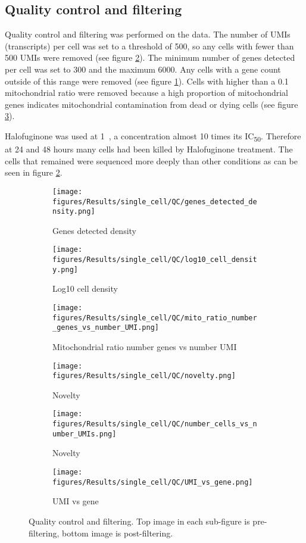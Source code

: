 \subsection{Quality control and filtering}
Quality control and filtering was performed on the data.
The number of UMIs (transcripts) per cell was set to a threshold of 500, so any cells with fewer than 500 UMIs were removed (see figure \ref{fig:QC_log10}).
The minimum number of genes detected per cell was set to 300 and the maximum 6000.
Any cells with a gene count outside of this range were removed (see figure \ref{fig:QC_genes_detected}).
Cells with higher than a 0.1 mitochondrial ratio were removed because a high proportion of mitochondrial genes indicates mitochondrial contamination from dead or dying cells (see figure \ref{fig:QC_mito}).

Halofuginone was used at 1\si{\micro\Molar}, a concentration almost 10 times its IC\textsubscript{50}.
Therefore at 24 and 48 hours many cells had been killed by Halofuginone treatment.
The cells that remained were sequenced more deeply than other conditions as can be seen in figure \ref{fig:QC_log10}.

\begin{figure}[pt]
\centering
\begin{subfigure}[t]{0.8\textwidth}
    \texttt{[image: figures/Results/single\_cell/QC/genes\_detected\_density.png]}
    \caption{Genes detected density}
    \label{fig:QC_genes_detected}
\end{subfigure}
%
\medskip
\begin{subfigure}[t]{0.8\textwidth}
    \texttt{[image: figures/Results/single\_cell/QC/log10\_cell\_density.png]}
    \caption{Log10 cell density}
    \label{fig:QC_log10}
\end{subfigure}
%
\medskip
\begin{subfigure}[t]{0.8\textwidth}
    \texttt{[image: figures/Results/single\_cell/QC/mito\_ratio\_number\_genes\_vs\_number\_UMI.png]}
    \caption{Mitochondrial ratio number genes vs number UMI}
    \label{fig:QC_mito}
\end{subfigure}
%
\medskip
\begin{subfigure}[t]{0.8\textwidth}
    \texttt{[image: figures/Results/single\_cell/QC/novelty.png]}
    \caption{Novelty}
    \label{fig:QC_novelty}
\end{subfigure}
%
\medskip
\begin{subfigure}[t]{0.8\textwidth}
    \texttt{[image: figures/Results/single\_cell/QC/number\_cells\_vs\_number\_UMIs.png]}
    \caption{Novelty}
    \label{fig:QC_novelty}
\end{subfigure}
%
\medskip
\begin{subfigure}[t]{0.8\textwidth}
    \texttt{[image: figures/Results/single\_cell/QC/UMI\_vs\_gene.png]}
    \caption{UMI vs gene}
    \label{fig:QC_umi_vs_gene}
\end{subfigure}
%
\caption[Single-cell quality control and filtering]{Quality control and filtering. Top image in each sub-figure is pre-filtering, bottom image is post-filtering.}
\label{fig:sc_qc}
\end{figure}

